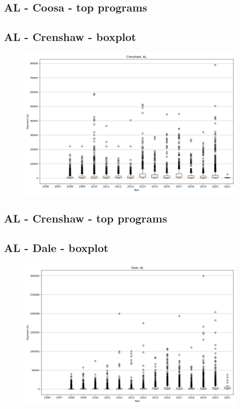 \subsection*{AL - Coosa - top programs}

\newpage
\subsection*{AL - Crenshaw - boxplot}
\begin{figure}[h]
\centering
\includegraphics[width=7in]{../output/boxplots/counties/Crenshaw-AL_boxplot.png}
\end{figure}


\subsection*{AL - Crenshaw - top programs}

\newpage
\subsection*{AL - Dale - boxplot}
\begin{figure}[h]
\centering
\includegraphics[width=7in]{../output/boxplots/counties/Dale-AL_boxplot.png}
\end{figure}


